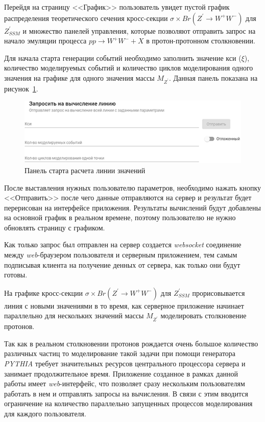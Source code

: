 Перейдя на страницу <<График>> пользователь увидет пустой график распределения теоретического сечения кросс-секции $\sigma \times Br({Z}^{\prime} \rightarrow {W}^{+}{W}^{-})$ для ${Z}^{\prime}_{SSM}$ и множество панелей управления, которые позволяют отправить запрос на начало эмуляции процесса $pp \rightarrow {W}^{+}{W}^{-} + X$ в протон-протонном столкновении. 

Для начала старта генерации событий необходимо заполнить значение кси ($\xi$), количество моделируемых событий и количество циклов моделирования одного значения на графике для одного значения массы ${M}_{{Z}^{\prime}}$. Данная панель показана на рисунок~\ref{fig:request-line}.

\vspace{16pt}
\begin{figure}[!h]
	\centering
	\includegraphics[width=\textwidth]{figures/request-line.png}
	\caption{Панель старта расчета линии значений}
	\label{fig:request-line}
\end{figure}

После выставления нужных пользователю параметров, необходимо нажать кнопку <<Отправить>> после чего данные отправляются на сервер и результат будет перерисован на интерфейсе приложения. Результаты вычислений будут добавлены на основной график в реальном времене, поэтому пользователю не нужно обновлять страницу с графиком.

Как только запрос был отправлен на сервер создается \textit{websocket} соединение между \textit{web}-браузером пользователя и серверным приложением, тем самым подписывая клиента на получение денных от сервера, как только они будут готовы.

На графике кросс-секции $\sigma \times Br({Z}^{\prime} \rightarrow {W}^{+}{W}^{-})$ для ${Z}^{\prime}_{SSM}$ прорисовывается линия с новыми значениями в то время, как серверное приложение начинает параллельно для нескольких значений массы ${M}_{{Z}^{\prime}}$ моделировать столкновение протонов.

Так как в реальном столкновении протонов рождается очень большое количество различных частиц то моделирование такой задачи при помощи генератора \textit{PYTHIA} требует значительных ресурсов центрального процессора сервера и занимает продолжительное время. Приложение созданное в рамках данной работы имеет \textit{web}-интерфейс, что позволяет сразу нескольким пользователям работать в нем и отправлять запросы на вычисления. В связи с этим вводится ограничение на количество параллельно запущенных процессов моделирования для каждого пользователя.

